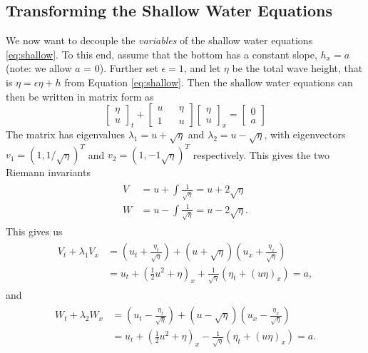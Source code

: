\documentclass[12pt]{article}
\begin{document}
\subsection{Transforming the Shallow Water Equations}
We now want to decouple the \emph{variables} of the shallow water equations \ref{eq:shallow}. To this end, 
assume that the bottom has a constant slope, $h_x = a$ (note: we allow $a$ = 0). Further set $\epsilon =1$,
and let $\eta$ be the total wave height, that is $\eta = \epsilon\eta + h$ from Equation \eqref{eq:shallow}.
Then the shallow water equations can then be written in matrix form as
\begin{equation}
\begin{bmatrix}
	\eta \\
	u
\end{bmatrix}_t
+
\begin{bmatrix}
u	&& 	\eta \\
1 	&&	u
\end{bmatrix}
\begin{bmatrix}
\eta\\
u
\end{bmatrix}_x
= 
\begin{bmatrix}
0\\
a
\end{bmatrix}
\end{equation}
The matrix has eigenvalues $\lambda_1 = u + \sqrt{\eta}$ and $\lambda_2 = u - \sqrt{\eta}$, with eigenvectors $v_1 = (1,1/\sqrt{\eta})^T$ and $v_2 = (1, {-}1\sqrt{\eta})^T$ respectively. This gives the two Riemann invariants
\begin{align}
	\begin{aligned}
		V &= u + \int \frac{1}{\sqrt{\eta}} = u + 2\sqrt{\eta}\\
		W &= u - \int \frac{1}{\sqrt{\eta}} = u - 2\sqrt{\eta}.
	\end{aligned}
\end{align}
This gives us
\begin{align}
\begin{aligned}
	\label{eq:shallowWaterRiemannV}
	V_t + \lambda_1V_x &= \left(u_t + \frac{\eta_t}{\sqrt{\eta}}\right) + (u + \sqrt{\eta})\left(u_x + \frac{\eta_x}{\sqrt \eta}\right)\\
	& = u_t + \left(\frac{1}{2}u^2 + \eta\right)_x + \frac{1}{\sqrt \eta}(\eta_t + (u\eta)_x) = a,
\end{aligned}
\end{align}
and
\begin{align}
	\label{eq:shallowWaterRiemannW}
	\begin{aligned}
		W_t + \lambda_2W_x &= \left(u_t - \frac{\eta_t}{\sqrt{\eta}}\right) + (u - \sqrt{\eta})\left(u_x - \frac{\eta_x}{\sqrt \eta}\right)\\
		& = u_t + \left(\frac{1}{2}u^2 + \eta\right)_x - \frac{1}{\sqrt \eta}(\eta_t + (u\eta)_x) = a.
	\end{aligned}
\end{align}
%
%
\end{document}
